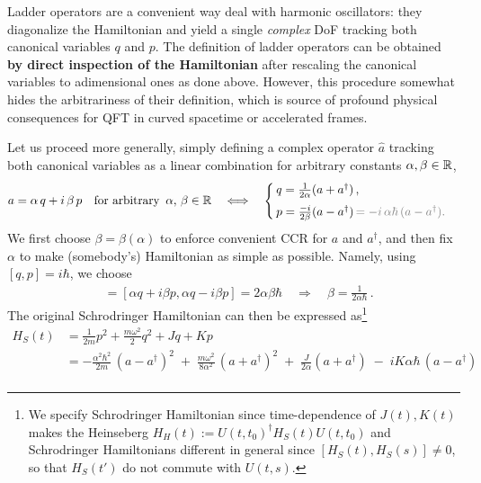 \documentclass[../QFT_main.tex]{subfiles}
\begin{document}
\begin{mytheorem}
%
Ladder operators are a convenient way deal with harmonic oscillators: they diagonalize the Hamiltonian and yield a single \emph{complex} DoF tracking both canonical variables $q$ and $p$. 
The definition of ladder operators can be obtained \textbf{by direct inspection of the Hamiltonian} after rescaling the canonical variables to adimensional ones as done above.
However, this procedure somewhat hides the arbitrariness of their definition, which is source of profound physical consequences for QFT in curved spacetime or accelerated frames.

Let us proceed more generally, simply defining a complex operator $\hat{a}$ tracking both canonical variables as a linear combination for arbitrary constants $\alpha,\beta\in\mathbb{R}$,
{\small\begin{align}\label{eq:ladder_operator_heuristics_1D}
    a = \alpha\, q + i \,\beta \,p \quad \text{for arbitrary }\, \alpha,\, \beta \in \mathbb{R}
    \quad \Longleftrightarrow \quad \begin{cases}
        q = \frac{1}{2\alpha}(a + a^\dagger)\,,\\[4pt]
        p = \frac{-i}{2\beta}(a - a^\dagger)\,{\color{gray}= -i\,\alpha\hbar\,(a-a^\dagger).}
    \end{cases}
\end{align}}
We first choose $\beta=\beta(\alpha)$ to enforce convenient CCR for $a$ and $a^\dagger$, and then fix $\alpha$ to make (somebody's) Hamiltonian as simple as possible.
Namely, using $[q,p]=i\hbar$, we choose
\begin{align}
    [a, a^\dagger] &= [\alpha q + i \beta p, \alpha q - i \beta p] = 2 \alpha \beta \hbar \quad \Rightarrow\quad \beta = \frac{1}{2\alpha \hbar}\,.
\end{align}
The original Schrodringer Hamiltonian can then be expressed as\footnote{We specify Schrodringer Hamiltonian since time-dependence of $J(t),K(t)$ makes the Heinseberg $H_H(t):=U(t,t_0)^\dagger H_S(t)U(t,t_0)$ and Schrodringer Hamiltonians different in general since $[H_S(t),H_S(s)]\neq0$, so that $H_S(t')$ do not commute with $U(t,s)$. }
{\small\begin{align}
    H_S(t)&= \frac{1}{2m}p^2+\frac{m\omega^2}{2}q^2 +Jq + Kp\\
    &= -\frac{\alpha^2\hbar^2}{2m}\,(a-a^\dagger)^2
    \;+\;\frac{m\omega^2}{8\alpha^2}\,(a+a^\dagger)^2
    \;+\;\frac{J}{2\alpha}(a+a^\dagger)
    \;-\; iK\alpha\hbar\,(a-a^\dagger)
    \\

\end{align}}
\end{mytheorem}
\end{document}
